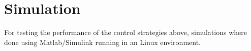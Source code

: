 \section{Simulation}
For testing the performance of the control strategies above, simulations where done using Matlab/Simulink running in an Linux environment. 
